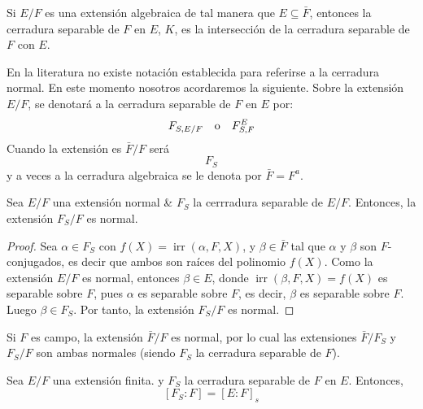 \documentclass[12pt]{report}
\theoremstyle{largebreak}
\DeclareMathOperator{\irr}{irr}
\begin{document}
    \begin{obs}
        Si $E/F$ es una extensión algebraica de tal manera que $E\subseteq \bar{F}$, entonces la cerradura separable de $F$ en $E$, $K$, es la intersección de la cerradura separable de $F$ con $E$.
    \end{obs}

    \begin{obs}
        En la literatura no existe notación establecida para referirse a la cerradura normal. En este momento nosotros acordaremos la siguiente. Sobre la extensión $E/F$, se denotará a la cerradura separable de $F$ en $E$ por:
        \begin{equation*}
            F_{S,E/F}\quad\textup{o}\quad F_{S,F}^{E}
        \end{equation*} 
        Cuando la extensión es $\bar{F}/F$ será
        \begin{equation*}
            F_S
        \end{equation*}
        y a veces a la cerradura algebraica se le denota por $\bar{F}=F^{a}$.
    \end{obs}

    \begin{propo}
        Sea $E/F$ una extensión normal \& $F_S$ la cerrradura separable de $E/F$. Entonces, la extensión $F_S/F$ es normal.
    \end{propo}

    \begin{proof}
        Sea $\alpha\in F_S$ con $f(X)=\irr(\alpha, F, X)$, y $\beta\in \bar{F}$ tal que $\alpha$ y $\beta$ son $F$-conjugados, es decir que ambos son raíces del polinomio $f(X)$.
        Como la extensión $E/F$ es normal, entonces $\beta\in E$, donde $\irr(\beta, F, X)=f(X)$ es separable sobre $F$, pues $\alpha$ es separable sobre $F$, es decir, $\beta$ es separable sobre $F$.
        Luego $\beta\in F_S$.
        Por tanto, la extensión $F_S/F$ es normal.
    \end{proof}

    \begin{obs}
        Si $F$ es campo, la extensión $\bar{F}/F$ es normal, por lo cual las extensiones $\bar{F}/F_S$ y $F_S/F$ son ambas normales (siendo $F_S$ la cerradura separable de $F$). 
    \end{obs}

    \begin{propo}
        Sea $E/F$ una extensión finita. y $F_S$ la cerradura separable de $F$ en $E$. Entonces,
        \begin{equation}
            \left[F_S:F\right]=\left[E:F\right]_s
        \end{equation}
    \end{propo}
\end{document}
